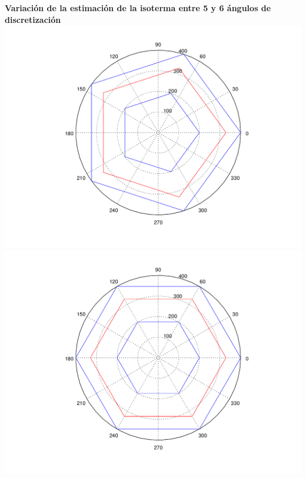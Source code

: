 \begin{enumerate}
	\vspace{0.5cm}
	  	\textbf{Variación de la estimación de la isoterma entre 5 y 6 ángulos de discretización}\\
		\includegraphics[scale=0.35]{experimentos1a_1b/evolucion_posicion_isoterma_temperatura/variacion_angulos_radio_fijo_se_suaviza_isoterma/test10_050_radios_005_angulos_inst_001_isomap.png}
		\includegraphics[scale=0.35]{experimentos1a_1b/evolucion_posicion_isoterma_temperatura/variacion_angulos_radio_fijo_se_suaviza_isoterma/test10_050_radios_006_angulos_inst_001_isomap.png}


\end{enumerate}
